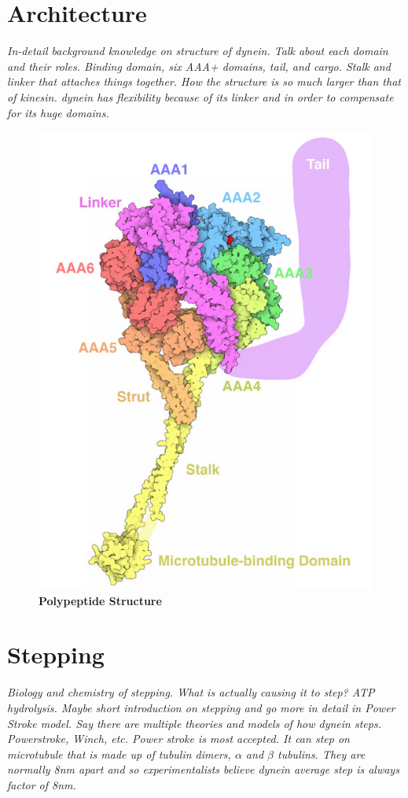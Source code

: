 \section{Architecture}
\textit{In-detail background knowledge on structure of dynein. Talk about each domain and their roles. Binding domain, six AAA+ domains, tail, and cargo. Stalk and linker that attaches things together. How the structure is so much larger than that of kinesin. dynein has flexibility because of its linker and in order to compensate for its huge domains. }

\begin{figure}[H]
	\centering
	\includegraphics[width=0.6\columnwidth]{Figures/dynein_polypeptide.jpg}
	\caption[Polypeptide Structure]{\textbf{Polypeptide Structure} \cite{GoodsellArt}}
	\label{fig:polypeptide}
\end{figure}


\section{Stepping}
\textit{Biology and chemistry of stepping. What is actually causing it to step? ATP hydrolysis. Maybe short introduction on stepping and go more in detail in Power Stroke model. Say there are multiple theories and models of how dynein steps. Powerstroke, Winch, etc. Power stroke is most accepted. It can step on microtubule that is made up of tubulin dimers, $\alpha$ and $\beta$ tubulins. They are normally 8nm apart and so experimentalists believe dynein average step is always factor of 8nm. }


